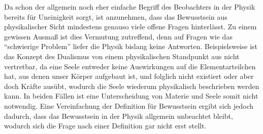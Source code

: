 Da schon der allgemein noch eher einfache Begriff des Beobachters in der Physik bereits für Uneinigkeit sorgt,
ist anzunehmen, dass das Bewusstsein aus physikalischer Sicht mindestens genauso viele offene Fragen hinterlässt.
Zu einem gewissen Ausmaß ist dies Vermutung zutreffend, denn auf Fragen wie das \enquote{schwierige Problem} 
liefer die Physik bislang keine Antworten. Beispielsweise ist das Konzept des Dualismus von einem physikalischen 
Standpunkt aus nicht vertretbar, da eine Seele entweder keine Auswirkungen auf
die Elementarteilchen hat, aus denen unser Körper aufgebaut ist, und folglich nicht existiert oder aber doch Kräfte 
ausübt, wodurch die Seele wiederum physikalisch beschrieben werden kann. In beiden Fällen ist eine Unterscheidung von 
Materie und Seele somit nicht notwendig.
Eine Vereinfachung der Definition für Bewusstsein ergibt sich jedoch dadurch, dass das Bewusstsein in der Physik
allgemein unbeachtet bleibt, wodurch sich die Frage nach einer Definition gar nicht erst stellt.\,\cite{Tegmark_15_long} 




